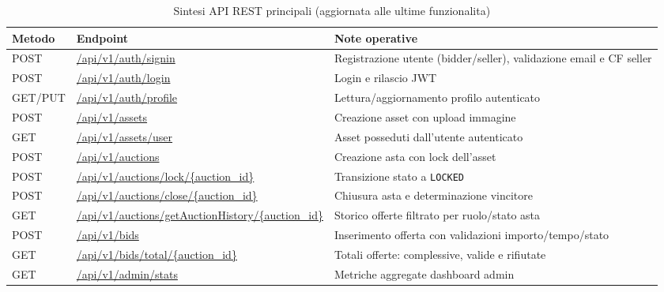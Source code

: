 \begin{table}[H]
    \centering
    \small
    \begin{tabular}{@{}p{}p{}p{}@{}}
        \toprule
        \textbf{Metodo} & \textbf{Endpoint} & \textbf{Note operative} \\
        \midrule
        POST & \url{/api/v1/auth/signin} & Registrazione utente (bidder/seller), validazione email e CF seller \\
        POST & \url{/api/v1/auth/login} & Login e rilascio JWT \\
        GET/PUT & \url{/api/v1/auth/profile} & Lettura/aggiornamento profilo autenticato \\
        POST & \url{/api/v1/assets} & Creazione asset con upload immagine \\
        GET & \url{/api/v1/assets/user} & Asset posseduti dall'utente autenticato \\
        POST & \url{/api/v1/auctions} & Creazione asta con lock dell'asset \\
        POST & \url{/api/v1/auctions/lock/\{auction\_id\}} & Transizione stato a \texttt{LOCKED} \\
        POST & \url{/api/v1/auctions/close/\{auction\_id\}} & Chiusura asta e determinazione vincitore \\
        GET & \url{/api/v1/auctions/getAuctionHistory/\{auction\_id\}} & Storico offerte filtrato per ruolo/stato asta \\
        POST & \url{/api/v1/bids} & Inserimento offerta con validazioni importo/tempo/stato \\
        GET & \url{/api/v1/bids/total/\{auction\_id\}} & Totali offerte: complessive, valide e rifiutate \\
        GET & \url{/api/v1/admin/stats} & Metriche aggregate dashboard admin \\
        \bottomrule
    \end{tabular}
    \caption{Sintesi API REST principali (aggiornata alle ultime funzionalita)}
\end{table}

\newpage


